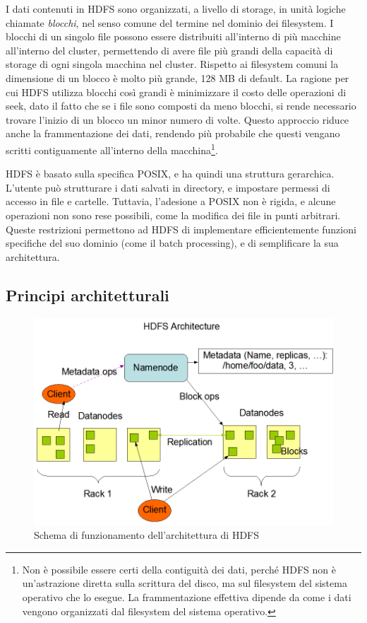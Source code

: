 \documentclass[italian,a4paper, twoside, 12pt]{report}
\begin{document}
I dati contenuti in HDFS sono organizzati, a livello di storage, in
unità logiche chiamate \emph{blocchi}, nel senso comune del termine nel
dominio dei filesystem. I blocchi di un singolo file possono essere
distribuiti all'interno di più macchine all'interno del cluster,
permettendo di avere file più grandi della capacità di storage di ogni
singola macchina nel cluster. Rispetto ai filesystem comuni la
dimensione di un blocco è molto più grande, 128 MB di default. La
ragione per cui HDFS utilizza blocchi così grandi è minimizzare il costo
delle operazioni di seek, dato il fatto che se i file sono composti da
meno blocchi, si rende necessario trovare l'inizio di un blocco un minor
numero di volte. Questo approccio riduce anche la frammentazione dei
dati, rendendo più probabile che questi vengano scritti contiguamente
all'interno della macchina\footnote{Non è possibile essere certi della
  contiguità dei dati, perché HDFS non è un'astrazione diretta sulla
  scrittura del disco, ma sul filesystem del sistema operativo che lo
  esegue. La frammentazione effettiva dipende da come i dati vengono
  organizzati dal filesystem del sistema operativo.}.

HDFS è basato sulla specifica POSIX, e ha quindi una struttura
gerarchica. L'utente può strutturare i dati salvati in directory, e
impostare permessi di accesso in file e cartelle. Tuttavia, l'adesione a
POSIX non è rigida, e alcune operazioni non sono rese possibili, come la
modifica dei file in punti arbitrari. Queste restrizioni permettono ad
HDFS di implementare efficientemente funzioni specifiche del suo dominio
(come il batch processing), e di semplificare la sua architettura.

\subsection{Principi architetturali}\label{principi-architetturali}

\begin{figure}
\centering
\includegraphics{img/hdfsarchitecture.png}
\caption{Schema di funzionamento dell'architettura di HDFS}
\end{figure}
\end{document}
